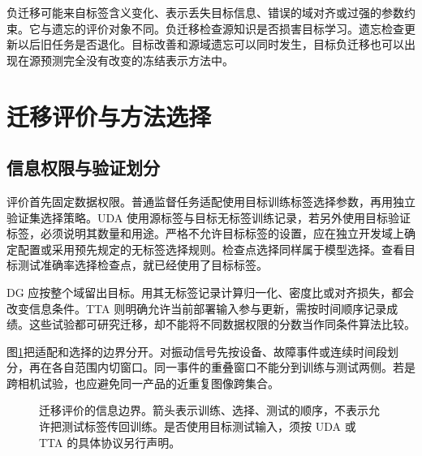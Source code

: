 负迁移可能来自标签含义变化、表示丢失目标信息、错误的域对齐或过强的参数约束。它与遗忘的评价对象不同。负迁移检查源知识是否损害目标学习。遗忘检查更新以后旧任务是否退化。目标改善和源域遗忘可以同时发生，目标负迁移也可以出现在源预测完全没有改变的冻结表示方法中。

\section{迁移评价与方法选择}

\subsection{信息权限与验证划分}
评价首先固定数据权限。普通监督任务适配使用目标训练标签选择参数，再用独立验证集选择策略。UDA 使用源标签与目标无标签训练记录，若另外使用目标验证标签，必须说明其数量和用途。严格不允许目标标签的设置，应在独立开发域上确定配置或采用预先规定的无标签选择规则。检查点选择同样属于模型选择。查看目标测试准确率选择检查点，就已经使用了目标标签。

DG 应按整个域留出目标。用其无标签记录计算归一化、密度比或对齐损失，都会改变信息条件。TTA 则明确允许当前部署输入参与更新，需按时间顺序记录成绩。这些试验都可研究迁移，却不能将不同数据权限的分数当作同条件算法比较。

图\ref{fig:transfer-evaluation}把适配和选择的边界分开。对振动信号先按设备、故障事件或连续时间段划分，再在各自范围内切窗口。同一事件的重叠窗口不能分到训练与测试两侧。若是跨相机试验，也应避免同一产品的近重复图像跨集合。
\begin{figure}[htbp]
\centering
{}
\caption{迁移评价的信息边界。箭头表示训练、选择、测试的顺序，不表示允许把测试标签传回训练。是否使用目标测试输入，须按 UDA 或 TTA 的具体协议另行声明。}
\label{fig:transfer-evaluation}
\end{figure}

